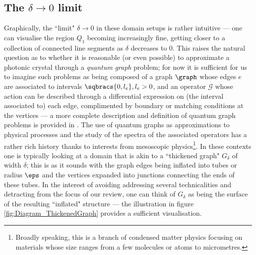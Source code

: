 
\subsection{The $\delta\rightarrow0$ limit}

Graphically, the ``limit" $\delta\rightarrow0$ in these domain setups is rather intuitive --- one can visualise the region $Q_1$ becoming increasingly fine, getting closer to a collection of connected line segments as $\delta$ decreases to 0.
This raises the natural question as to whether it is reasonable (or even possible) to approximate a photonic crystal through a \emph{quantum graph} problem; for now it is sufficient for us to imagine such problems as being composed of a graph $\graph$ whose edges $e$ are associated to intervals $\sqbracs{0,l_{e}}, l_{e}>0$, and an operator $\mathcal{G}$ whose action can be described through a differential expression on (the interval associated to) each edge, complimented by boundary or matching conditions at the vertices --- a more complete description and definition of quantum graph problems is provided in .
The use of quantum graphs as approximations to physical processes and the study of the spectra of the associated operators has a rather rich history thanks  to interests from mesoscopic physics\footnote{Broadly speaking, this is a branch of condensed matter physics focusing on materials whose size ranges from a few molecules or atoms to micrometres.}.
In these contexts one is typically looking at a domain that is akin to a ``thickened graph" $G_{\delta}$ of width $\delta$; this is as it sounds with the graph edges being inflated into tubes or radius $\eps$ and the vertices expanded into junctions connecting the ends of these tubes.
In the interest of avoiding addressing several technicalities and detracting from the focus of our review, one can think of $G_{\delta}$ as being the surface of the resulting ``inflated" structure --- the illustration in figure \ref{fig:Diagram_ThickenedGraph} provides a sufficient visualisation.
